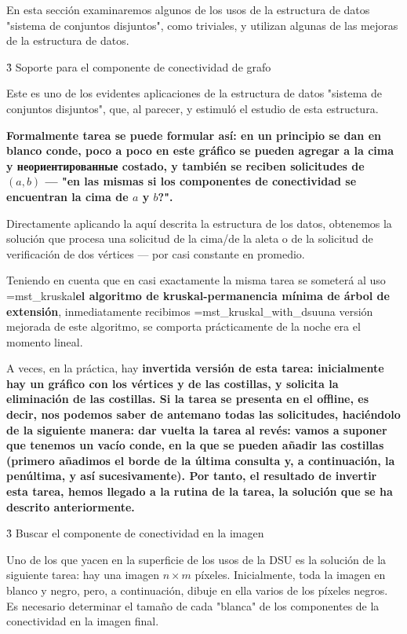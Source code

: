 En esta sección examinaremos algunos de los usos de la estructura de datos "sistema de conjuntos disjuntos", como triviales, y utilizan algunas de las mejoras de la estructura de datos.



\h3{ Soporte para el componente de conectividad de grafo }

Este es uno de los evidentes aplicaciones de la estructura de datos "sistema de conjuntos disjuntos", que, al parecer, y estimuló el estudio de esta estructura.

\bf{Formalmente} tarea se puede formular así: en un principio se dan en blanco conde, poco a poco en este gráfico se pueden agregar a la cima y неориентированные costado, y también se reciben solicitudes de $(a,b)$ --- "en las mismas si los componentes de conectividad se encuentran la cima de $a$ y $b$?".

Directamente aplicando la aquí descrita la estructura de los datos, obtenemos la solución que procesa una solicitud de la cima/de la aleta o de la solicitud de verificación de dos vértices --- por casi constante en promedio.

Teniendo en cuenta que en casi exactamente la misma tarea se someterá al uso \algohref=mst_kruskal{\bf{el algoritmo de kruskal-permanencia mínima de árbol de extensión}}, inmediatamente recibimos \algohref=mst_kruskal_with_dsu{una versión mejorada de este algoritmo}, se comporta prácticamente de la noche era el momento lineal.

A veces, en la práctica, hay \bf{invertida versión de esta tarea}: inicialmente hay un gráfico con los vértices y de las costillas, y solicita la eliminación de las costillas. Si la tarea se presenta en el offline, es decir, nos podemos saber de antemano todas las solicitudes, haciéndolo de la siguiente manera: dar vuelta la tarea al revés: vamos a suponer que tenemos un vacío conde, en la que se pueden añadir las costillas (primero añadimos el borde de la última consulta y, a continuación, la penúltima, y así sucesivamente). Por tanto, el resultado de invertir esta tarea, hemos llegado a la rutina de la tarea, la solución que se ha descrito anteriormente.



\h3{ Buscar el componente de conectividad en la imagen }

Uno de los que yacen en la superficie de los usos de la DSU es la solución de la siguiente tarea: hay una imagen $n \times m$ píxeles. Inicialmente, toda la imagen en blanco y negro, pero, a continuación, dibuje en ella varios de los píxeles negros. Es necesario determinar el tamaño de cada "blanca" de los componentes de la conectividad en la imagen final.

